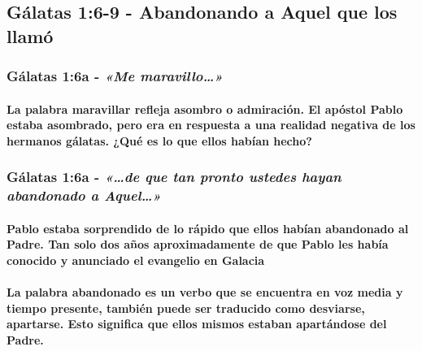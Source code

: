 \documentclass[11a pt,twoside]{article}
\newcommand{\scripture}[1]{%
  {\fontsize{12pt}{16pt}\selectfont\ScriptureFont\itshape #1}%
}
\let\oldsubsection\subsection
\renewcommand{\subsection}{\needspace{5\baselineskip}\oldsubsection}
\let\oldsubsubsection\subsubsection
\renewcommand{\subsubsection}{\needspace{4\baselineskip}\oldsubsubsection}
\let\oldparagraph\paragraph
\renewcommand{\paragraph}{\needspace{3\baselineskip}\oldparagraph}
\begin{document}
\subsection{Gálatas 1:6-9 - Abandonando a Aquel que los
llamó}\label{guxe1latas-16-9---abandonando-a-aquel-que-los-llamuxf3}

\subsubsection{\texorpdfstring{Gálatas 1:6a -
\scripture{«Me maravillo…»}}{Gálatas 1:6a - }}\label{guxe1latas-16a---me-maravillo}

\paragraph{La palabra maravillar refleja asombro o admiración. El
apóstol Pablo estaba asombrado, pero era en respuesta a una realidad
negativa de los hermanos gálatas. ¿Qué es lo que ellos habían
hecho?}\label{la-palabra-maravillar-refleja-asombro-o-admiraciuxf3n.-el-apuxf3stol-pablo-estaba-asombrado-pero-era-en-respuesta-a-una-realidad-negativa-de-los-hermanos-guxe1latas.-quuxe9-es-lo-que-ellos-habuxedan-hecho}

\subsubsection{\texorpdfstring{Gálatas 1:6a -
\scripture{«…de que tan pronto ustedes hayan abandonado a Aquel…»}}{Gálatas 1:6a - }}\label{guxe1latas-16a---de-que-tan-pronto-ustedes-hayan-abandonado-a-aquel}

\paragraph{Pablo estaba sorprendido de lo rápido que ellos habían
abandonado al Padre. Tan solo dos años aproximadamente de que Pablo les
había conocido y anunciado el evangelio en
Galacia}\label{pablo-estaba-sorprendido-de-lo-ruxe1pido-que-ellos-habuxedan-abandonado-al-padre.-tan-solo-dos-auxf1os-aproximadamente-de-que-pablo-les-habuxeda-conocido-y-anunciado-el-evangelio-en-galacia}

\paragraph{La palabra abandonado es un verbo que se encuentra en voz
media y tiempo presente, también puede ser traducido como desviarse,
apartarse. Esto significa que ellos mismos estaban apartándose del
Padre.}\label{la-palabra-abandonado-es-un-verbo-que-se-encuentra-en-voz-media-y-tiempo-presente-tambiuxe9n-puede-ser-traducido-como-desviarse-apartarse.-esto-significa-que-ellos-mismos-estaban-apartuxe1ndose-del-padre.}
\end{document}
